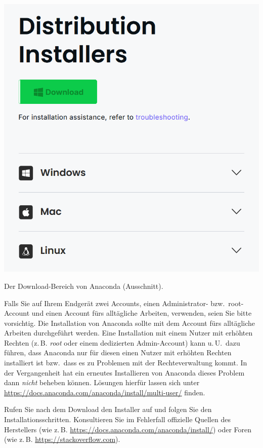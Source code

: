 \documentclass{tufte-handout}
\begin{document}
\begin{marginfigure}
  \includegraphics{anaconda}
  \caption{Der Download-Bereich von Anaconda (Ausschnitt).}%
\label{fig:anaconda}
\end{marginfigure}

Falls Sie auf Ihrem Endgerät zwei Accounts, einen Administrator- bzw.\ root-Account und einen Account fürs alltägliche Arbeiten, verwenden, seien Sie bitte vorsichtig.
Die Installation von Anaconda sollte mit dem Account fürs alltägliche Arbeiten durchgeführt werden.
Eine Installation mit einem Nutzer mit erhöhten Rechten (z.\,B. \emph{root} oder einem dedizierten Admin-Account) kann u.\,U.\ dazu führen, dass Anaconda nur für diesen einen Nutzer mit erhöhten Rechten installiert ist bzw.\ dass es zu Problemen mit der Rechteverwaltung kommt.
In der Vergangenheit hat ein erneutes Installieren von Anaconda dieses Problem dann \emph{nicht} beheben können.
Lösungen hierfür lassen sich unter \url{https://docs.anaconda.com/anaconda/install/multi-user/} finden.

Rufen Sie nach dem Download den Installer auf und folgen Sie den Installationsschritten.
Konsultieren Sie im Fehlerfall offizielle Quellen des Herstellers (wie z.\,B. \url{https://docs.anaconda.com/anaconda/install/}) oder Foren (wie z.\,B. \url{https://stackoverflow.com}).
\end{document}
